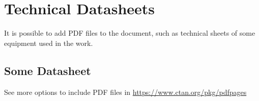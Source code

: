 
\chapter{Technical Datasheets}
\label{chapter:appendixDatasheets}

It is possible to add PDF files to the document, such as technical sheets of some equipment used in the work.

\section{Some Datasheet}
\label{section:datasheet}

See more options to include PDF files in \url{https://www.ctan.org/pkg/pdfpages}



